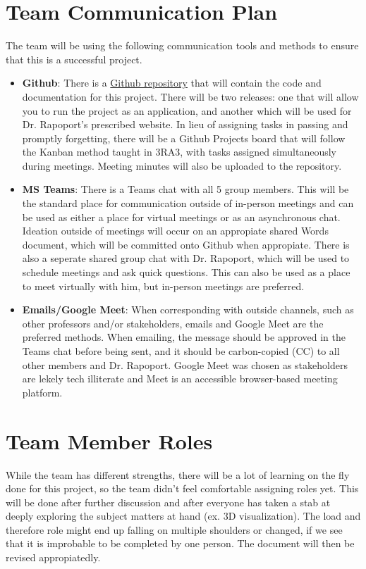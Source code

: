 \documentclass{article}
\begin{document}
\section{Team Communication Plan}

The team will be using the following communication tools and methods to ensure that this is a successful project.

\begin {itemize}
\item \textbf{Github}: There is a \href{https://github.com/Jacob-MB/magic-8}{Github repository} that will contain the code and documentation for this project. There will be two releases: one that will allow you to run the project as an application, and another which will be used for Dr. Rapoport's prescribed website. In lieu of assigning tasks in passing and promptly forgetting, there will be a Github Projects board that will follow the Kanban method taught in 3RA3, with tasks assigned simultaneously during meetings. Meeting minutes will also be uploaded to the repository.
\item \textbf{MS Teams}: There is a Teams chat with all 5 group members. This will be the standard place for communication outside of in-person meetings and can be used as either a place for virtual meetings or as an asynchronous chat. Ideation outside of meetings will occur on an appropiate shared Words document, which will be committed onto Github when appropiate. There is also a seperate shared group chat with Dr. Rapoport, which will be used to schedule meetings and ask quick questions. This can also be used as a place to meet virtually with him, but in-person meetings are preferred. 
\item \textbf{Emails/Google Meet}: When corresponding with outside channels, such as other professors and/or stakeholders, emails and Google Meet are the preferred methods. When emailing, the message should be approved in the Teams chat before being sent, and it should be carbon-copied (CC) to all other members and Dr. Rapoport. Google Meet was chosen as stakeholders are lekely tech illiterate and Meet is an accessible browser-based meeting platform. 
\end{itemize}

\section{Team Member Roles}

While the team has different strengths, there will be a lot of learning on the fly done for this project, so the team didn't feel comfortable assigning roles yet. This will be done after further discussion and after everyone has taken a stab at deeply exploring the subject matters at hand (ex. 3D visualization). The load and therefore role might end up falling on multiple shoulders or changed, if we see that it is improbable to be completed by one person. The document will then be revised appropiatedly.
\end{document}
